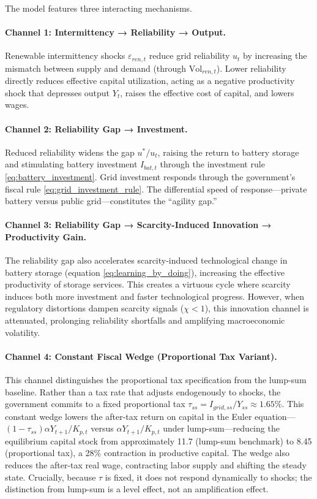 \documentclass[12pt, a4paper]{article}
\begin{document}
The model features three interacting mechanisms.

\paragraph{Channel 1: Intermittency → Reliability → Output.}
Renewable intermittency shocks $\varepsilon_{ren,t}$ reduce grid reliability $u_t$ by increasing the mismatch between supply and demand (through $\text{Vol}_{ren,t}$). Lower reliability directly reduces effective capital utilization, acting as a negative productivity shock that depresses output $Y_t$, raises the effective cost of capital, and lowers wages.

\paragraph{Channel 2: Reliability Gap → Investment.}
Reduced reliability widens the gap $u^*/u_t$, raising the return to battery storage and stimulating battery investment $I_{bat,t}$ through the investment rule \eqref{eq:battery_investment}. Grid investment responds through the government's fiscal rule \eqref{eq:grid_investment_rule}. The differential speed of response---private battery versus public grid---constitutes the ``agility gap.''

\paragraph{Channel 3: Reliability Gap → Scarcity-Induced Innovation → Productivity Gain.}
The reliability gap also accelerates scarcity-induced technological change in battery storage (equation \eqref{eq:learning_by_doing}), increasing the effective productivity of storage services. This creates a virtuous cycle where scarcity induces both more investment and faster technological progress. However, when regulatory distortions dampen scarcity signals ($\chi < 1$), this innovation channel is attenuated, prolonging reliability shortfalls and amplifying macroeconomic volatility.

\paragraph{Channel 4: Constant Fiscal Wedge (Proportional Tax Variant).}
This channel distinguishes the proportional tax specification from the lump-sum baseline. Rather than a tax rate that adjusts endogenously to shocks, the government commits to a fixed proportional tax $\tau_{ss} = I_{grid,ss}/Y_{ss} \approx 1.65\%$. This constant wedge lowers the after-tax return on capital in the Euler equation---$(1-\tau_{ss})\alpha Y_{t+1}/K_{p,t}$ versus $\alpha Y_{t+1}/K_{p,t}$ under lump-sum---reducing the equilibrium capital stock from approximately 11.7 (lump-sum benchmark) to 8.45 (proportional tax), a 28\% contraction in productive capital. The wedge also reduces the after-tax real wage, contracting labor supply and shifting the steady state. Crucially, because $\tau$ is fixed, it does not respond dynamically to shocks; the distinction from lump-sum is a level effect, not an amplification effect.
\end{document}
